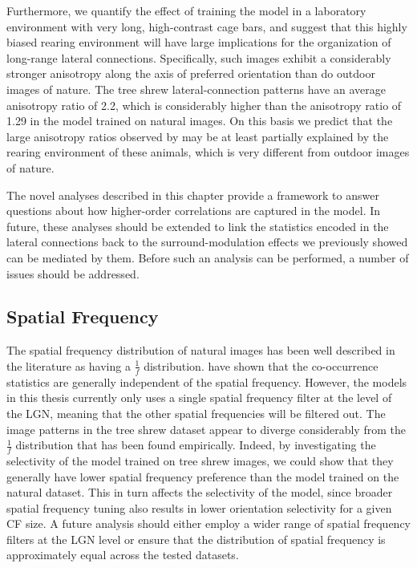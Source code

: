 Furthermore, we quantify the effect of training the model in a
laboratory environment with very long, high-contrast cage bars, and
suggest that this highly biased rearing environment will have large
implications for the organization of long-range lateral connections.
Specifically, such images exhibit a considerably stronger anisotropy
along the axis of preferred orientation than do outdoor images of
nature.  The tree shrew lateral-connection patterns have an average
anisotropy ratio of 2.2, which is considerably higher than the
anisotropy ratio of 1.29 in the model trained on natural images. On
this basis we predict that the large anisotropy ratios observed by
\citep{Bosking1997} may be at least partially explained by the rearing
environment of these animals, which is very different from outdoor
images of nature.

The novel analyses described in this chapter provide a framework to
answer questions about how higher-order correlations are captured in
the model. In future, these analyses should be extended to link the
statistics encoded in the lateral connections back to the
surround-modulation effects we previously showed can be mediated by
them. Before such an analysis can be performed, a number of issues
should be addressed.

\subsection{Spatial Frequency}

The spatial frequency distribution of natural images has been well
described in the literature as having a $\frac{1}{f}$
distribution. \cite{Perrinet2015} have shown that the co-occurrence
statistics are generally independent of the spatial
frequency. However, the models in this thesis currently only uses a
single spatial frequency filter at the level of the LGN, meaning that
the other spatial frequencies will be filtered out. The image patterns
in the tree shrew dataset appear to diverge considerably from the
$\frac{1}{f}$ distribution that has been found empirically. Indeed, by
investigating the selectivity of the model trained on tree shrew
images, we could show that they generally have lower spatial frequency
preference than the model trained on the natural dataset. This in turn
affects the selectivity of the model, since broader spatial frequency
tuning also results in lower orientation selectivity for a given CF
size. A future analysis should either employ a wider range of spatial
frequency filters at the LGN level or ensure that the distribution of
spatial frequency is approximately equal across the tested datasets.

